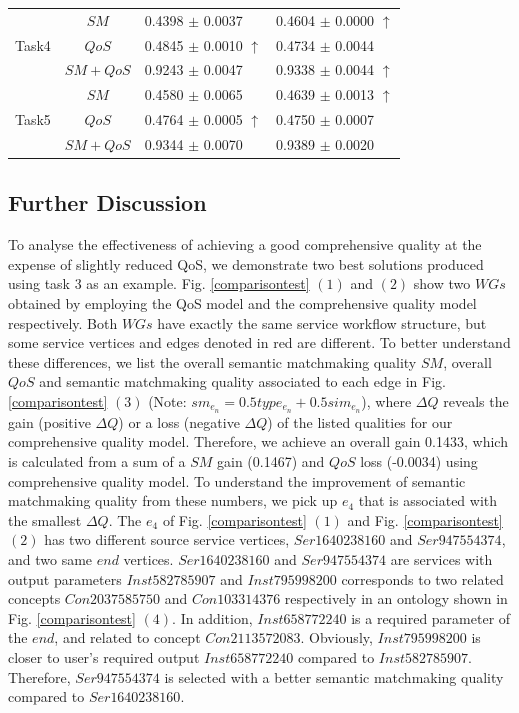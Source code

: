 \documentclass{llncs}
\begin{document}
\begin{table}[]
\begin{tabular}{c|c|l|l}
\multirow{3}{*}{Task4}  &$SM$      &0.4398 $\pm$ 0.0037               &0.4604 $\pm$ 0.0000 $\uparrow$ \\ \cline{2-4} 
                        &$QoS$     &0.4845 $\pm$ 0.0010 $\uparrow$    &0.4734 $\pm$ 0.0044            \\ \cline{2-4}
                        &$SM+QoS$  &0.9243 $\pm$ 0.0047               &0.9338 $\pm$ 0.0044 $\uparrow$           \\ \hline
\multirow{3}{*}{Task5}  &$SM$      &0.4580 $\pm$ 0.0065               &0.4639 $\pm$ 0.0013 $\uparrow$ \\ \cline{2-4} 
                        &$QoS$     &0.4764 $\pm$ 0.0005 $\uparrow$    &0.4750 $\pm$ 0.0007            \\ \cline{2-4}
                        &$SM+QoS$  &0.9344 $\pm$ 0.0070               &0.9389 $\pm$ 0.0020           \\ \hline
\end{tabular}
\end{table}
\vspace{-0.8cm}
\subsection{Further Discussion}\label{discuss1}
To analyse the effectiveness of achieving a good comprehensive quality at the expense of slightly reduced QoS, we demonstrate two best solutions produced using task 3 as an example. Fig. \ref{comparisontest} $(1)$ and $(2)$ show two $WGs$ obtained by employing the QoS model and the comprehensive quality model respectively. Both $WGs$ have exactly the same service workflow structure, but some service vertices and edges denoted in red are different. To better understand these differences, we list the overall semantic matchmaking quality $SM$,  overall $QoS$ and semantic matchmaking quality associated to each edge in Fig. \ref{comparisontest} $(3)$ (Note: $sm_{e_n} = 0.5type_{e_n} + 0.5 sim_{e_n}$), where $\Delta Q$ reveals the gain (positive $\Delta Q$) or a loss (negative $\Delta Q$) of the listed qualities for our comprehensive quality model. Therefore, we achieve an overall gain 0.1433, which is calculated from a sum of a $SM$ gain (0.1467) and $QoS$ loss (-0.0034) using comprehensive quality model. To understand the improvement of semantic matchmaking quality from these numbers, we pick up $e_4$ that is associated with the smallest $\Delta Q$. The $e_4$ of Fig. \ref{comparisontest} $(1)$ and Fig. \ref{comparisontest} $(2)$ has two different source service vertices, $Ser1640238160$ and $Ser947554374$, and two same $end$ vertices. $Ser1640238160$ and $Ser947554374$ are services with output parameters $Inst582785907$ and  $Inst795998200$ corresponds to two related concepts $Con2037585750$ and $Con103314376$ respectively in an ontology shown in Fig. \ref{comparisontest} $(4)$. In addition, $Inst658772240$ is a required parameter of the $end$, and related to concept $Con2113572083$. Obviously, $Inst795998200$ is closer to user's required output $Inst658772240$ compared to $Inst582785907$. Therefore,  $Ser947554374$ is selected with a better semantic matchmaking quality compared to $Ser1640238160$.
\vspace{-0.6cm}
\end{document}
